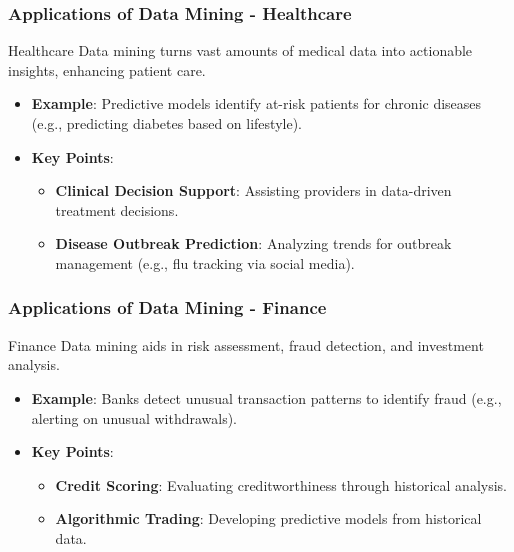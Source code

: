 \documentclass[aspectratio=169]{beamer}
\begin{document}
\begin{frame}[fragile]
    \frametitle{Applications of Data Mining - Healthcare}
    \begin{block}{Healthcare}
        Data mining turns vast amounts of medical data into actionable insights, enhancing patient care.
    \end{block}
    \begin{itemize}
        \item \textbf{Example}: Predictive models identify at-risk patients for chronic diseases (e.g., predicting diabetes based on lifestyle).
        \item \textbf{Key Points}:
            \begin{itemize}
                \item \textbf{Clinical Decision Support}: Assisting providers in data-driven treatment decisions.
                \item \textbf{Disease Outbreak Prediction}: Analyzing trends for outbreak management (e.g., flu tracking via social media).
            \end{itemize}
    \end{itemize}
\end{frame}

\begin{frame}[fragile]
    \frametitle{Applications of Data Mining - Finance}
    \begin{block}{Finance}
        Data mining aids in risk assessment, fraud detection, and investment analysis.
    \end{block}
    \begin{itemize}
        \item \textbf{Example}: Banks detect unusual transaction patterns to identify fraud (e.g., alerting on unusual withdrawals).
        \item \textbf{Key Points}:
            \begin{itemize}
                \item \textbf{Credit Scoring}: Evaluating creditworthiness through historical analysis.
                \item \textbf{Algorithmic Trading}: Developing predictive models from historical data.
            \end{itemize}
    \end{itemize}
\end{frame}
\end{document}
